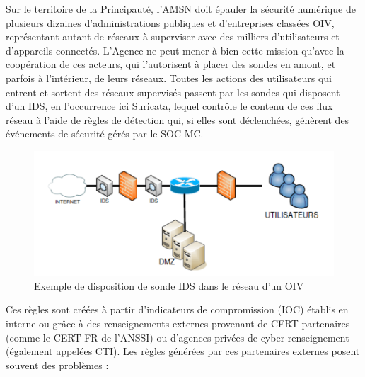 \vspace{1em}

Sur le territoire de la Principauté, l'AMSN doit épauler la sécurité numérique de plusieurs dizaines d'administrations publiques et d'entreprises classées OIV, représentant autant de réseaux à superviser avec des milliers d'utilisateurs et d'appareils connectés.
L'Agence ne peut mener à bien cette mission qu'avec la coopération de ces acteurs, qui l'autorisent à placer des sondes en amont, et parfois à l'intérieur, de leurs réseaux. Toutes les actions des utilisateurs qui entrent et sortent des réseaux supervisés passent par les sondes qui disposent d'un IDS, en l'occurrence ici Suricata, lequel contrôle le contenu de ces flux réseau à l'aide de règles de détection qui, si elles sont déclenchées, génèrent des événements de sécurité gérés par le SOC-MC.

\begin{figure}[h]%
    \center%
    \includegraphics[width=1\textwidth]{assets/reseau.png}
    \caption[Exemple de disposition de sonde IDS dans le réseau d'un OIV (source:\href{https://blogger.googleusercontent.com/img/b/R29vZ2xl/AVvXsEhz0rffx8tqoJRqjF0Hf3LAERS8e7tpmQVnPzlBITzud8iMUOh63zfDIyLKLXnQprLLNAycblYb02W3Y4004q3ruHhdZ3T9Dy7KTMyydsLMRjR2UGkzQ6hIOcwM8DiSLeLp0pZeyyCt5CDl/s1600/Capture.PNG}{eventus-networks.blogspot.com})]{Exemple de disposition de sonde IDS dans le réseau d'un OIV}\label{fig:test}
\end{figure}

\vspace{1em}

Ces règles sont créées à partir d'indicateurs de compromission (IOC) établis en interne ou grâce à des renseignements externes provenant de CERT partenaires (comme le CERT-FR de l'ANSSI) ou d'agences privées de cyber-renseignement (également appelées CTI). Les règles générées par ces partenaires externes posent souvent des problèmes :\\

